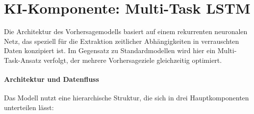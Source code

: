 \section{KI-Komponente: Multi-Task LSTM}
\label{sec:ki_komponente}

Die Architektur des Vorhersagemodells basiert auf einem rekurrenten neuronalen Netz, das speziell für die Extraktion zeitlicher Abhängigkeiten in verrauschten Daten konzipiert ist. Im Gegensatz zu Standardmodellen wird hier ein Multi-Task-Ansatz verfolgt, der mehrere Vorhersageziele gleichzeitig optimiert.

\paragraph{Architektur und Datenfluss}
Das Modell nutzt eine hierarchische Struktur, die sich in drei Hauptkomponenten unterteilen lässt:
